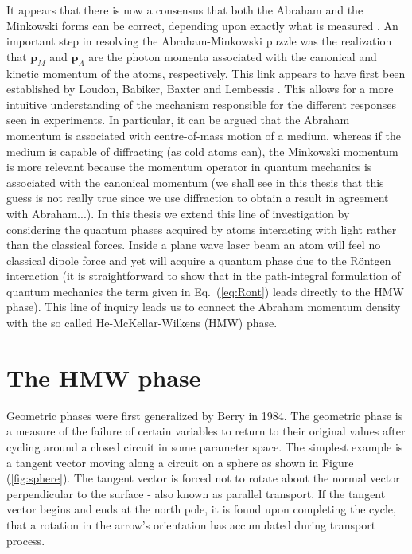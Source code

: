 It appears that there is now a consensus that both the Abraham and the Minkowski forms can be correct, depending upon exactly what is measured \cite{Loudon05,barnett10}. An important step in resolving the Abraham-Minkowski puzzle was the realization that $\mathbf{p}_{M}$ and $\mathbf{p}_A$ are the photon momenta associated with the canonical and kinetic momentum of the atoms, respectively.  This link appears to have first been established by Loudon, Babiker, Baxter and Lembessis \cite{lembessis}. This  allows for a more intuitive understanding of the mechanism responsible for the different responses seen in experiments. In particular, it can be argued that the Abraham momentum is associated with centre-of-mass motion of a medium, whereas if the medium is capable of diffracting (as cold atoms can), the Minkowski momentum is more relevant because the momentum operator in quantum mechanics is associated with the canonical momentum (we shall see in this thesis that this guess is not really true since we use diffraction to obtain a result in agreement with Abraham...).  In this thesis we extend this line of investigation by considering the quantum phases acquired by atoms interacting with light rather than the classical forces. Inside a plane wave laser beam an atom will feel no classical dipole force and yet will acquire a quantum phase due to the R\"{o}ntgen interaction (it is straightforward to show that in the path-integral formulation of quantum mechanics the term given in Eq.\ (\ref{eq:Ront}) leads directly to the HMW phase). This line of inquiry leads us to connect the Abraham momentum density with the so called He-McKellar-Wilkens (HMW) phase. 

\newpage




\section{The HMW phase}
Geometric phases were first generalized by Berry in 1984.  The geometric phase is a measure of the failure of certain variables to return to their original values after cycling around a closed circuit in some parameter space.  The simplest example is a tangent vector moving along a circuit on a sphere as shown in Figure (\ref{fig:sphere}).  The tangent vector is forced not to rotate about the normal vector perpendicular to the surface - also known as parallel transport. If the tangent vector begins and ends at the north pole, it is found upon completing the cycle, that a rotation in the arrow's orientation has accumulated during transport process.

